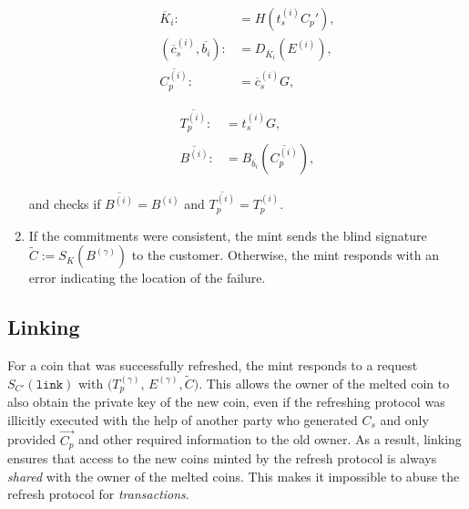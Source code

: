 \documentclass{llncs}
\begin{document}
\begin{enumerate}
    \vspace{-2ex}
    \begin{minipage}{5cm}
    \begin{align*}
      \overline{K}_i :&= H(t_s^{(i)} C_p'), \\
      (\overline{c}_s^{(i)}, \overline{b_i}) :&= D_{\overline{K}_i}(E^{(i)}), \\
     \overline{C^{(i)}_p} :&= \overline{c}_s^{(i)} G,
     \end{align*}
     \end{minipage}
    \begin{minipage}{5cm}
      \begin{align*}
       \overline{T_p^{(i)}} :&= t_s^{(i)} G, \\ \\
      \overline{B^{(i)}} :&= B_{\overline{b_i}}(\overline{C_p^{(i)}}),
      \end{align*}
    \end{minipage}

    and checks if $\overline{B^{(i)}} = B^{(i)}$
    and $\overline{T^{(i)}_p} = T^{(i)}_p$.


  \item \label{step:refresh-done} If the commitments were consistent,
    the mint sends the blind signature $\widetilde{C} :=
    S_{K}(B^{(\gamma)})$ to the customer.  Otherwise, the mint responds
    with an error indicating the location of the failure.
\end{enumerate}

%

\subsection{Linking}

For a coin that was successfully refreshed, the mint responds to a
request $S_{C'}(\mathtt{link})$ with $(T^{(\gamma)}_p$, $E^{(\gamma)},
\widetilde{C})$.
%
This allows the owner of the melted coin to also obtain the private
key of the new coin, even if the refreshing protocol was illicitly
executed with the help of another party who generated $C_s$ and only
provided $\vec{C_p}$ and other required information to the old owner.
As a result, linking ensures that access to the new coins minted by
the refresh protocol is always {\em shared} with the owner of the
melted coins.  This makes it impossible to abuse the refresh protocol
for {\em transactions}.
\end{document}
